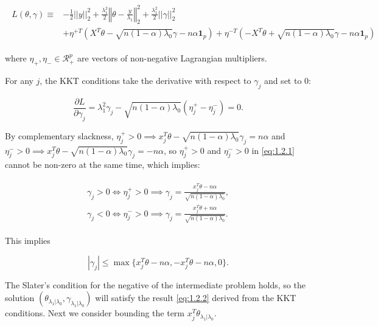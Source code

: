 \begin{gather}
    \begin{aligned}
        L(\theta,\gamma)\equiv&-\frac{1}{2}||y||_2^2+\frac{\lambda_1^2}{2}\left\Vert\theta-\frac{y}{\lambda_1}\right\Vert_2^2+\frac{\lambda_1^2}{2}||\gamma||_2^2\\
        &+\eta^{+T}(X^T\theta-\sqrt{n(1-\alpha)\lambda_0}\gamma-n\alpha\mathbf{1}_p)+\eta^{-T}(-X^T\theta+\sqrt{n(1-\alpha)\lambda_0}\gamma-n\alpha\mathbf{1}_p)
    \end{aligned}
\end{gather}

where $\eta_+,\eta_-\in \mathcal{R}^p_+$ are vectors of non-negative Lagrangian multipliers.

For any $j$, the KKT conditions take the derivative with respect to $\gamma_j$ and set to 0:

\begin{equation}
    \label{eq:1.2.1}
    \frac{\partial L}{\partial \gamma_j}=\lambda_1^2\gamma_j-\sqrt{n(1-\alpha)\lambda_0}(\eta_j^+-\eta_j^-)=0.
\end{equation}

By complementary slackness, $\eta_j^+>0\implies x_j^T\theta-\sqrt{n(1-\alpha)\lambda_0}\gamma_j=n\alpha$ and $\eta_j^->0\implies x_j^T\theta-\sqrt{n(1-\alpha)\lambda_0}\gamma_j=-n\alpha$, so $\eta_j^+>0$ and $\eta_j^->0$ in \eqref{eq:1.2.1} cannot be non-zero at the same time, which implies:

\begin{gather}
    \begin{aligned}
        \gamma_j>0\iff\eta_j^+>0\implies \gamma_j=\frac{x_j^T\theta-n\alpha}{\sqrt{n(1-\alpha)\lambda_0}},\\
        \gamma_j<0\iff\eta_j^->0\implies \gamma_j=\frac{x_j^T\theta+n\alpha}{\sqrt{n(1-\alpha)\lambda_0}}.
    \end{aligned}
\end{gather}

This implies

\begin{equation}
    \label{eq:1.2.2}
    |\gamma_j|\leq \max\{x_j^T\theta-n\alpha,-x_j^T\theta-n\alpha,0\}.
\end{equation}

The Slater's condition for the negative of the intermediate problem holds, so the solution $(\theta_{\lambda_1|\lambda_0},\gamma_{\lambda_1|\lambda_0})$ will satisfy the result \eqref{eq:1.2.2} derived from the KKT conditions. Next we consider bounding the term $x_j^T\theta_{\lambda_1|\lambda_0}$.

